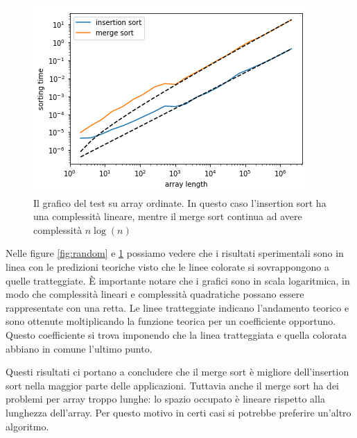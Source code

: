 \documentclass{article}
\begin{document}
\begin{figure}[ht]
    \centering
    \includegraphics{sorted}
    \caption{Il grafico del test su array ordinate. In questo caso l'insertion sort ha una complessità lineare, mentre il merge sort continua ad avere complessità $n\log(n)$}
    \label{fig:sorted}
\end{figure}

Nelle figure \ref{fig:random} e \ref{fig:sorted} possiamo vedere che i risultati sperimentali sono in linea con le predizioni teoriche visto che le linee colorate si sovrappongono a quelle tratteggiate. È importante notare che i grafici sono in scala logaritmica, in modo che complessità lineari e complessità quadratiche possano essere rappresentate con una retta. Le linee tratteggiate indicano l'andamento teorico e sono ottenute moltiplicando la funzione teorica per un coefficiente opportuno. Questo coefficiente si trova imponendo che la linea tratteggiata e quella colorata abbiano in comune l'ultimo punto.

Questi risultati ci portano a concludere che il merge sort è migliore dell'insertion sort nella maggior parte delle applicazioni. Tuttavia anche il merge sort ha dei problemi per array troppo lunghe: lo spazio occupato è lineare rispetto alla lunghezza dell'array. Per questo motivo in certi casi si potrebbe preferire un'altro algoritmo.
\end{document}
